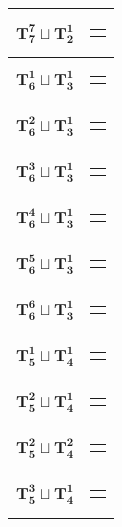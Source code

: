 \documentclass{article}
\begin{document}
{\begin{longtable}{|c|c|}
    $\mathbf{T_{7}^{7}} \sqcup \mathbf{T_{2}^{1}}$ & \begin{tabular}{@{}l@{}} $(4,8,1,6,0,5,3)\sqcup(9,10)$ \end{tabular} \\ \hline
    $\mathbf{T_{6}^{1}} \sqcup \mathbf{T_{3}^{1}}$ & \begin{tabular}{@{}l@{}} $(0,6,1,5,2,9)\sqcup(11,10,12)$ \end{tabular} \\ \hline
    $\mathbf{T_{6}^{2}} \sqcup \mathbf{T_{3}^{1}}$ & \begin{tabular}{@{}l@{}} $(3,6,1,8,4,0)\sqcup(10,9,11)$ \end{tabular} \\ \hline
    $\mathbf{T_{6}^{3}} \sqcup \mathbf{T_{3}^{1}}$ & \begin{tabular}{@{}l@{}} $(5,11,9,12,7,10)\sqcup(1,8,4)$ \end{tabular} \\ \hline
    $\mathbf{T_{6}^{4}} \sqcup \mathbf{T_{3}^{1}}$ & \begin{tabular}{@{}l@{}} $(3,8,4,1,6,7)\sqcup(10,9,11)$ \end{tabular} \\ \hline
    $\mathbf{T_{6}^{5}} \sqcup \mathbf{T_{3}^{1}}$ & \begin{tabular}{@{}l@{}} $(5,1,8,3,4,7)\sqcup(10,9,11)$ \end{tabular} \\ \hline
    $\mathbf{T_{6}^{6}} \sqcup \mathbf{T_{3}^{1}}$ & \begin{tabular}{@{}l@{}} $(4,1,8,5,6,7)\sqcup(10,9,11)$ \end{tabular} \\ \hline
    $\mathbf{T_{5}^{1}} \sqcup \mathbf{T_{4}^{1}}$ & \begin{tabular}{@{}l@{}} $(0,6,1,5,2)\sqcup(9,8,10,3)$ \end{tabular} \\ \hline
    $\mathbf{T_{5}^{2}} \sqcup \mathbf{T_{4}^{1}}$ & \begin{tabular}{@{}l@{}} $(7,1,8,5,6)\sqcup(0,4,2,3)$ \end{tabular} \\ \hline
    $\mathbf{T_{5}^{2}} \sqcup \mathbf{T_{4}^{2}}$ & \begin{tabular}{@{}l@{}} $(7,1,8,4,6)\sqcup(10,9,11,12)$ \end{tabular} \\ \hline
    $\mathbf{T_{5}^{3}} \sqcup \mathbf{T_{4}^{1}}$ & \begin{tabular}{@{}l@{}} $(6,0,3,4,5)\sqcup(8,7,9,2)$ \end{tabular} \\ \hline

\end{longtable}}
\end{document}
